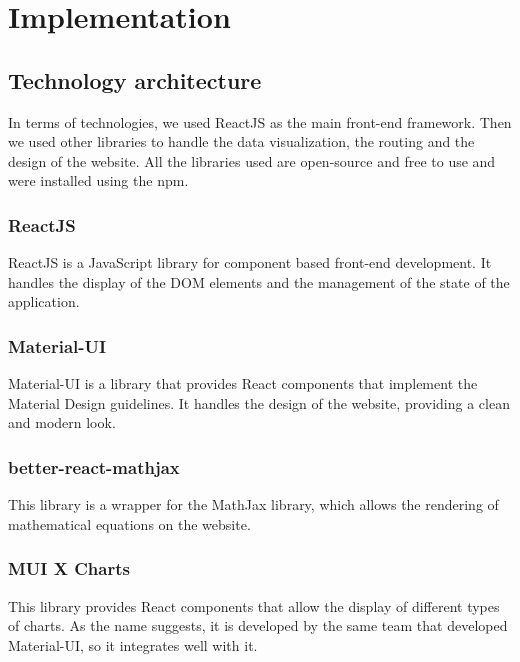\section{Implementation}

    \subsection{Technology architecture}

        In terms of technologies, we used ReactJS as the main front-end framework. Then we used other libraries to handle the data visualization, the routing and the design of the website. All the libraries used are open-source and free to use and were installed using the \ac{npm}. 

    \subsubsection{ReactJS}

        ReactJS is a JavaScript library for component based front-end development. It handles the display of the \ac{DOM} elements and the management of the state of the application. 

    \subsubsection{Material-UI}

        Material-UI is a library that provides React components that implement the Material Design guidelines. It handles the design of the website, providing a clean and modern look.

    \subsubsection{better-react-mathjax}

        This library is a wrapper for the MathJax library, which allows the rendering of mathematical equations on the website.

    \subsubsection{MUI X Charts}

        This library provides React components that allow the display of different types of charts. As the name suggests, it is developed by the same team that developed Material-UI, so it integrates well with it.

